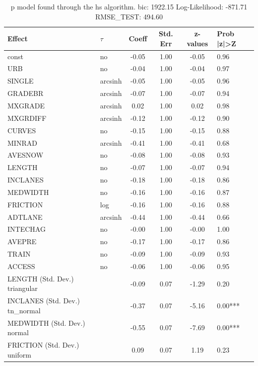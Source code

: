 \begin{table}
	\caption{p model found through the hs algorithm. bic: 1922.15 Log-Likelihood: -871.71 RMSE_TEST: 494.60}
	\begin{center}
		\begin{tabular}{|l|l|c|c|c|l|}
			\hline
			Effect & $\tau$ & Coeff & Std. Err & z-values & Prob |z|>Z \\
			\hline
			const & no & -0.05 & 1.00 & -0.05 & 0.96 \\
			\hline
			URB & no & -0.04 & 1.00 & -0.04 & 0.97 \\
			\hline
			SINGLE & arcsinh & -0.05 & 1.00 & -0.05 & 0.96 \\
			\hline
			GRADEBR & arcsinh & -0.07 & 1.00 & -0.07 & 0.94 \\
			\hline
			MXGRADE & arcsinh & 0.02 & 1.00 & 0.02 & 0.98 \\
			\hline
			MXGRDIFF & arcsinh & -0.12 & 1.00 & -0.12 & 0.90 \\
			\hline
			CURVES & no & -0.15 & 1.00 & -0.15 & 0.88 \\
			\hline
			MINRAD & arcsinh & -0.41 & 1.00 & -0.41 & 0.68 \\
			\hline
			AVESNOW & no & -0.08 & 1.00 & -0.08 & 0.93 \\
			\hline
			LENGTH & no & -0.07 & 1.00 & -0.07 & 0.94 \\
			\hline
			INCLANES & no & -0.18 & 1.00 & -0.18 & 0.86 \\
			\hline
			MEDWIDTH & no & -0.16 & 1.00 & -0.16 & 0.87 \\
			\hline
			FRICTION & log & -0.16 & 1.00 & -0.16 & 0.88 \\
			\hline
			ADTLANE & arcsinh & -0.44 & 1.00 & -0.44 & 0.66 \\
			\hline
			INTECHAG & no & -0.00 & 1.00 & -0.00 & 1.00 \\
			\hline
			AVEPRE & no & -0.17 & 1.00 & -0.17 & 0.86 \\
			\hline
			TRAIN & no & -0.09 & 1.00 & -0.09 & 0.93 \\
			\hline
			ACCESS & no & -0.06 & 1.00 & -0.06 & 0.95 \\
			\hline
			LENGTH (Std. Dev.) triangular &  & -0.09 & 0.07 & -1.29 & 0.20 \\
			\hline
			INCLANES (Std. Dev.) tn_normal &  & -0.37 & 0.07 & -5.16 & 0.00*** \\
			\hline
			MEDWIDTH (Std. Dev.) normal &  & -0.55 & 0.07 & -7.69 & 0.00*** \\
			\hline
			FRICTION (Std. Dev.) uniform &  & 0.09 & 0.07 & 1.19 & 0.23 \\

\end{tabular}
\end{center}
\end{table}
